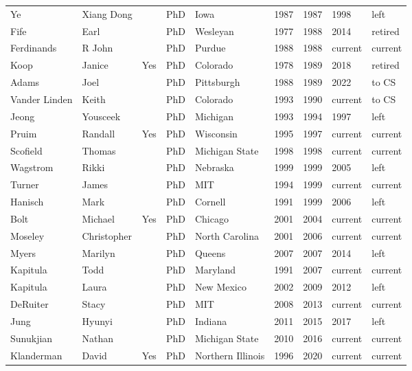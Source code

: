 \documentclass[
]{book}
\begin{document}
\begin{table}
\begin{tabular}[t]{lllllrrll}
\addlinespace
Ye & Xiang Dong &  & PhD & Iowa & 1987 & 1987 & 1998 & left\\
Fife & Earl &  & PhD & Wesleyan & 1977 & 1988 & 2014 & retired\\
Ferdinands & R John &  & PhD & Purdue & 1988 & 1988 & current & current\\
Koop & Janice & Yes & PhD & Colorado & 1978 & 1989 & 2018 & retired\\
Adams & Joel &  & PhD & Pittsburgh & 1988 & 1989 & 2022 & to CS\\
\addlinespace
Vander Linden & Keith &  & PhD & Colorado & 1993 & 1990 & current & to CS\\
Jeong & Yousceek &  & PhD & Michigan & 1993 & 1994 & 1997 & left\\
Pruim & Randall & Yes & PhD & Wisconsin & 1995 & 1997 & current & current\\
Scofield & Thomas &  & PhD & Michigan State & 1998 & 1998 & current & current\\
Wagstrom & Rikki &  & PhD & Nebraska & 1999 & 1999 & 2005 & left\\
\addlinespace
Turner & James &  & PhD & MIT & 1994 & 1999 & current & current\\
Hanisch & Mark &  & PhD & Cornell & 1991 & 1999 & 2006 & left\\
Bolt & Michael & Yes & PhD & Chicago & 2001 & 2004 & current & current\\
Moseley & Christopher &  & PhD & North Carolina & 2001 & 2006 & current & current\\
Myers & Marilyn &  & PhD & Queens & 2007 & 2007 & 2014 & left\\
\addlinespace
Kapitula & Todd &  & PhD & Maryland & 1991 & 2007 & current & current\\
Kapitula & Laura &  & PhD & New Mexico & 2002 & 2009 & 2012 & left\\
DeRuiter & Stacy &  & PhD & MIT & 2008 & 2013 & current & current\\
Jung & Hyunyi &  & PhD & Indiana & 2011 & 2015 & 2017 & left\\
Sunukjian & Nathan &  & PhD & Michigan State & 2010 & 2016 & current & current\\
\addlinespace
Klanderman & David & Yes & PhD & Northern Illinois & 1996 & 2020 & current & current\\
\bottomrule
\end{tabular}
\end{table}

  
\end{document}
